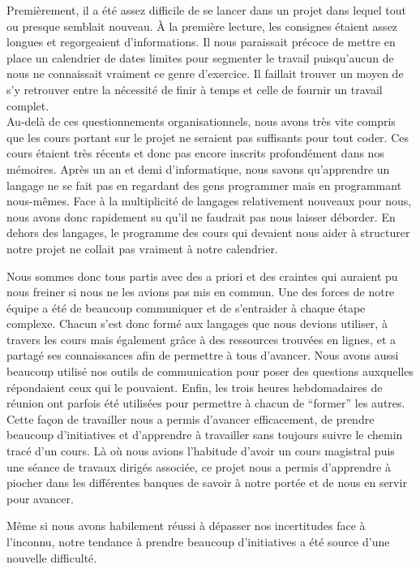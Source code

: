 \documentclass[12pt]{report}
\begin{document}
        \bigskip
        \par
        Premièrement, il a été assez difficile de se lancer dans un projet dans lequel tout ou presque semblait nouveau. À la première lecture, les consignes étaient assez longues et regorgeaient d’informations. Il nous paraissait précoce de mettre en place un calendrier de dates limites pour segmenter le travail puisqu’aucun de nous ne connaissait vraiment ce genre d’exercice. Il faillait trouver un moyen de s’y retrouver entre la nécessité de finir à temps et celle de fournir un travail complet.\\Au-delà de ces questionnements organisationnels, nous avons très vite compris que les cours portant sur le projet ne seraient pas suffisants pour tout coder. Ces cours étaient très récents et donc pas encore inscrits profondément dans nos mémoires. Après un an et demi d’informatique, nous savons qu’apprendre un langage ne se fait pas en regardant des gens programmer mais en programmant nous-mêmes. Face à la multiplicité de langages relativement nouveaux pour nous, nous avons donc rapidement su qu’il ne faudrait pas nous laisser déborder. En dehors des langages, le programme des cours qui devaient nous aider à structurer notre projet ne collait pas vraiment à notre calendrier.
        \par
        Nous sommes donc tous partis avec des a priori et des craintes qui auraient pu nous freiner si nous ne les avions pas mis en commun. Une des forces de notre équipe a été de beaucoup communiquer et de s’entraider à chaque étape complexe. Chacun s’est donc formé aux langages que nous devions utiliser, à travers les cours mais également grâce à des ressources trouvées en lignes, et a partagé ses connaissances afin de permettre à tous d’avancer. Nous avons aussi beaucoup utilisé nos outils de communication pour poser des questions auxquelles répondaient ceux qui le pouvaient. Enfin, les trois heures hebdomadaires de réunion ont parfois été utilisées pour permettre à chacun de “former” les autres.\\Cette façon de travailler nous a permis d’avancer efficacement, de prendre beaucoup d’initiatives et d’apprendre à travailler sans toujours suivre le chemin tracé d’un cours. Là où nous avions l’habitude d’avoir un cours magistral puis une séance de travaux dirigés associée, ce projet nous a permis d’apprendre à piocher dans les différentes banques de savoir à notre portée et de nous en servir pour avancer.
        \par
        Même si nous avons habilement réussi à dépasser nos incertitudes face à l’inconnu, notre tendance à prendre beaucoup d’initiatives a été source d’une nouvelle difficulté.
        
\end{document}
